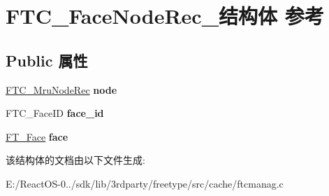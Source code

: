 \hypertarget{struct_f_t_c___face_node_rec__}{}\section{F\+T\+C\+\_\+\+Face\+Node\+Rec\+\_\+结构体 参考}
\label{struct_f_t_c___face_node_rec__}
\subsection*{Public 属性}
\begin{DoxyCompactItemize}
\item 
\mbox{\label{struct_f_t_c___face_node_rec___a71ac31f8bcc0764312b68200fb0172bc}} 
\hyperlink{struct_f_t_c___mru_node_rec__}{F\+T\+C\+\_\+\+Mru\+Node\+Rec} {\bfseries node}
\item 
\mbox{\label{struct_f_t_c___face_node_rec___a48b19b2cf2384d5e608e0e115f7dd8f6}} 
F\+T\+C\+\_\+\+Face\+ID {\bfseries face\+\_\+id}
\item 
\mbox{\label{struct_f_t_c___face_node_rec___ae2a8508f8bc0a9e7b5b4f4021addf47f}} 
\hyperlink{struct_f_t___face_rec__}{F\+T\+\_\+\+Face} {\bfseries face}
\end{DoxyCompactItemize}


该结构体的文档由以下文件生成\+:\begin{DoxyCompactItemize}
\item 
E\+:/\+React\+O\+S-\/0../sdk/lib/3rdparty/freetype/src/cache/ftcmanag.\+c\end{DoxyCompactItemize}
